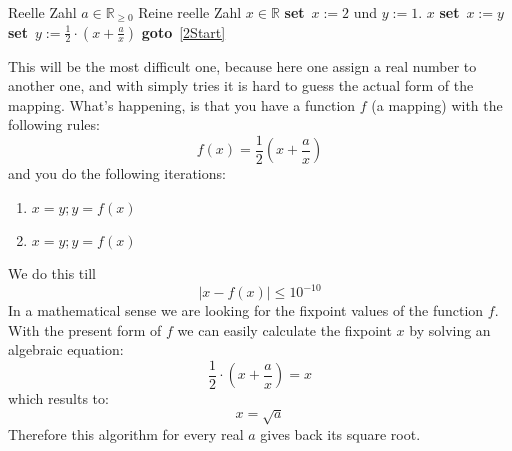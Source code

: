 \documentclass{article}[12pt]
\newcommand{\SET}{\textbf{set}\ }
\newcommand{\GOTO}{\textbf{goto}\ }
\begin{document}
\begin{algorithm}[H]
\caption{}
\begin{algorithmic}[1]
\REQUIRE Reelle Zahl $a\in\mathbb{R}_{\ge 0}$
\ENSURE Reine reelle Zahl $x\in\mathbb{R}$
\STATE \SET $x := 2$ und $y := 1$.
 \label{2Start} 
\RETURN $x$
\ENDIF
\STATE \SET $x := y$
\STATE \SET $y := \frac{1}{2} \cdot \left(x+\frac{a}{x}\right)$
\STATE \GOTO \ref{2Start}
\end{algorithmic}
\end{algorithm}
This will be the most difficult one, because here one assign a real number to another one, and with simply tries it is 
hard to guess the actual form of the mapping. What's happening, is that you have a function $f$ (a mapping) with the 
following rules:
\begin{equation}
f(x)=\frac{1}{2}\left(x+\frac{a}{x}\right)
\end{equation}
and you do the following iterations:
\begin{enumerate}
\item $x=y;y=f(x)$
\item $x=y;y=f(x)$
\end{enumerate}
We do this till 
\begin{equation}
\vert x-f(x) \vert \le 10^{-10}
\end{equation}
In a mathematical sense we are looking for the fixpoint values of the function $f$. With the present form of $f$ we can
easily calculate the fixpoint $x$ by solving an algebraic equation:
\begin{equation}
\frac{1}{2} \cdot \left(x+\frac{a}{x}\right)=x
\end{equation}
which results to:
\begin{equation}
x=\sqrt{a}
\end{equation}
Therefore this algorithm for every real $a$ gives back its square root.
\end{document}
